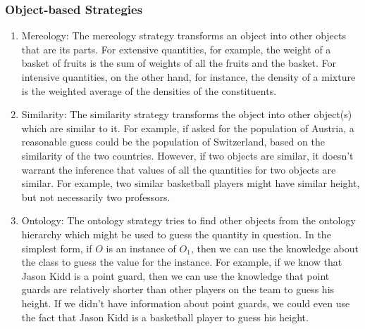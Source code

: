 \subsubsection{Object-based Strategies}
%
\begin{enumerate}
\item Mereology: The mereology strategy transforms an object into other objects that are its parts. For extensive quantities, for example, the weight of a basket of fruits is the sum of weights of all the fruits and the basket. For intensive quantities, on the other hand, for instance, the density of a mixture is the weighted average of the densities of the constituents.
%
\item Similarity: The similarity strategy transforms the object into other object(s) which are similar to it. For example, if asked for the population of Austria, a reasonable guess could be the population of Switzerland, based on the similarity of the two countries. However, if two objects are similar, it doesn't warrant the inference that values of all the quantities for two objects are similar. For example, two similar basketball players might have similar height, but not necessarily two professors.
%
\item Ontology: The ontology strategy tries to find other objects from the ontology hierarchy which might be used to guess the quantity in question. In the simplest form, if $O$ is an instance of $O_1$, then we can use the knowledge about the class to guess the value for the instance. For example, if we know that Jason Kidd is a point guard, then we can use the knowledge that point guards are relatively shorter than other players on the team to guess his height. If we didn't have information about point guards, we could even use the fact that Jason Kidd is a basketball player to guess his height.
\end{enumerate}


